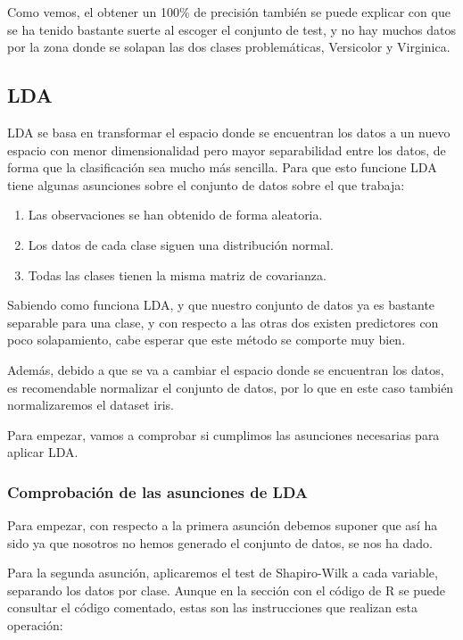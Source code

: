 Como vemos, el obtener un 100\% de precisión también se puede explicar con que se ha tenido bastante suerte al escoger el conjunto de test, y no hay muchos datos por la zona donde se solapan las dos clases problemáticas, Versicolor y Virginica.

\subsection{LDA}

LDA se basa en transformar el espacio donde se encuentran los datos a un nuevo espacio con menor dimensionalidad pero mayor separabilidad entre los datos, de forma que la clasificación sea mucho más sencilla. Para que esto funcione LDA tiene algunas asunciones sobre el conjunto de datos sobre el que trabaja:

\begin{enumerate}
	\item Las observaciones se han obtenido de forma aleatoria.
	\item Los datos de cada clase siguen una distribución normal.
	\item Todas las clases tienen la misma matriz de covarianza.
\end{enumerate}

Sabiendo como funciona LDA, y que nuestro conjunto de datos ya es bastante separable para una clase, y con respecto a las otras dos existen predictores con poco solapamiento, cabe esperar que este método se comporte muy bien.

Además, debido a que se va a cambiar el espacio donde se encuentran los datos, es recomendable normalizar el conjunto de datos, por lo que en este caso también normalizaremos el dataset iris.

Para empezar, vamos a comprobar si cumplimos las asunciones necesarias para aplicar LDA.

\subsubsection{Comprobación de las asunciones de LDA}

Para empezar, con respecto a la primera asunción debemos suponer que así ha sido ya que nosotros no hemos generado el conjunto de datos, se nos ha dado.

Para la segunda asunción, aplicaremos el test de Shapiro-Wilk a cada variable, separando los datos por clase. Aunque en la sección con el código de R se puede consultar el código comentado, estas son las instrucciones que realizan esta operación:

